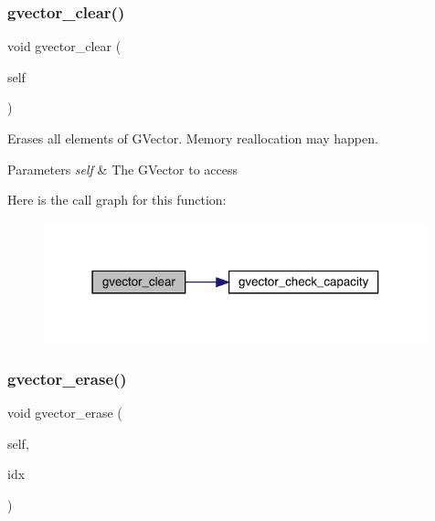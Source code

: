 \subsubsection{\texorpdfstring{gvector\+\_\+clear()}{gvector\_clear()}}
{\footnotesize\ttfamily void gvector\+\_\+clear (\begin{DoxyParamCaption}\item[{\hyperlink{group___g_vector_ga6d90d5e6b721779a43354f2752b79281}{G\+Vector} $\ast$}]{self }\end{DoxyParamCaption})}



Erases all elements of G\+Vector. Memory reallocation may happen. 


\begin{DoxyParams}{Parameters}
{\em self} & The G\+Vector to access \\
\hline
\end{DoxyParams}
Here is the call graph for this function\+:\nopagebreak
\begin{figure}[H]
\begin{center}
\leavevmode
\includegraphics[width=315pt]{group___g_vector_ga58f71f3cb3c10d00005e3f58951a9184_cgraph}
\end{center}
\end{figure}
\hypertarget{group___g_vector_ga7efdee3a454559bde23b23f31d40b4db}{}\label{group___g_vector_ga7efdee3a454559bde23b23f31d40b4db} 
\subsubsection{\texorpdfstring{gvector\+\_\+erase()}{gvector\_erase()}}
{\footnotesize\ttfamily void gvector\+\_\+erase (\begin{DoxyParamCaption}\item[{\hyperlink{group___g_vector_ga6d90d5e6b721779a43354f2752b79281}{G\+Vector} $\ast$}]{self,  }\item[{unsigned}]{idx }\end{DoxyParamCaption})}



